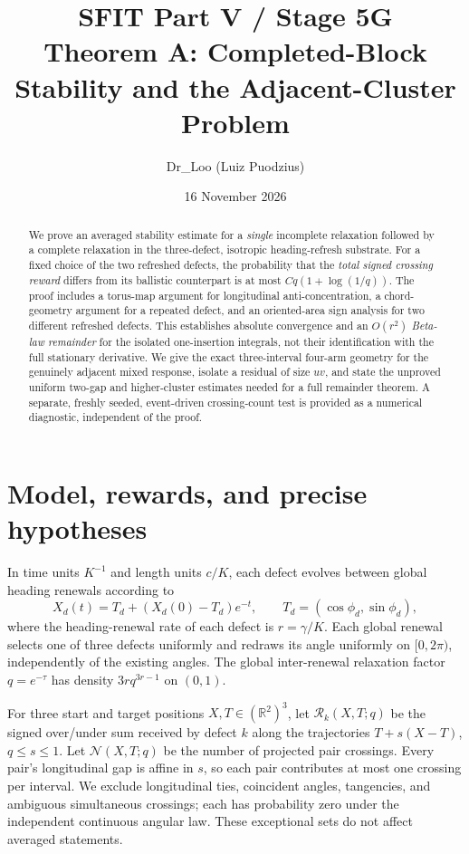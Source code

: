 \documentclass[11pt]{article}
\title{SFIT Part V / Stage 5G\\Theorem A: Completed-Block Stability and the Adjacent-Cluster Problem}
\author{Dr\_Loo (Luiz Puodzius)}
\date{16 November 2026}
\theoremstyle{remark}\newtheorem{remark}[theorem]{Remark}
\newcommand{\R}{\mathcal R}
\newcommand{\N}{\mathcal N}
\begin{document}
\maketitle
\begin{abstract}
We prove an averaged stability estimate for a \emph{single} incomplete relaxation followed by a complete relaxation in the three-defect, isotropic heading-refresh substrate. For a fixed choice of the two refreshed defects, the probability that the \emph{total signed crossing reward} differs from its ballistic counterpart is at most $Cq(1+\log(1/q))$. The proof includes a torus-map argument for longitudinal anti-concentration, a chord-geometry argument for a repeated defect, and an oriented-area sign analysis for two different refreshed defects. This establishes absolute convergence and an $O(r^2)$ \emph{Beta-law remainder} for the isolated one-insertion integrals, not their identification with the full stationary derivative. We give the exact three-interval four-arm geometry for the genuinely adjacent mixed response, isolate a residual of size $uv$, and state the unproved uniform two-gap and higher-cluster estimates needed for a full remainder theorem. A separate, freshly seeded, event-driven crossing-count test is provided as a numerical diagnostic, independent of the proof.
\end{abstract}

\section{Model, rewards, and precise hypotheses}
In time units $K^{-1}$ and length units $c/K$, each defect evolves between global heading renewals according to
\begin{equation}\label{eq:law}
X_d(t)=T_d+(X_d(0)-T_d)e^{-t},\qquad T_d=(\cos\phi_d,\sin\phi_d),
\end{equation}
where the heading-renewal rate of each defect is $r=\gamma/K$. Each global renewal selects one of three defects uniformly and redraws its angle uniformly on $[0,2\pi)$, independently of the existing angles. The global inter-renewal relaxation factor $q=e^{-\tau}$ has density $3r q^{3r-1}$ on $(0,1)$.

For three start and target positions $X,T\in(\mathbb R^2)^3$, let $\R_k(X,T;q)$ be the signed over/under sum received by defect $k$ along the trajectories $T+s(X-T)$, $q\le s\le1$. Let $\N(X,T;q)$ be the number of projected pair crossings. Every pair's longitudinal gap is affine in $s$, so each pair contributes at most one crossing per interval. We exclude longitudinal ties, coincident angles, tangencies, and ambiguous simultaneous crossings; each has probability zero under the independent continuous angular law. These exceptional sets do not affect averaged statements.
\end{document}
